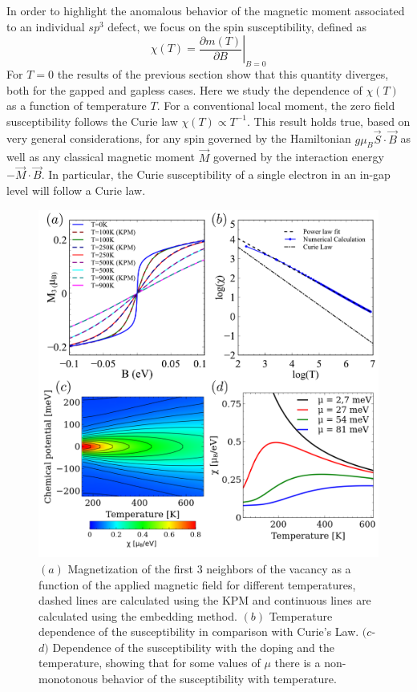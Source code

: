 In order to highlight the anomalous behavior of the magnetic  moment associated to an individual $sp^3$ defect, we focus on the spin susceptibility, defined as
\begin{equation}
  \chi(T) = \left.\frac{\partial m (T)}{\partial B}\right|_{B=0}
\label{susceptibility}
\end{equation}
For $T=0$ the results of the previous section show that this quantity diverges, both for the gapped and gapless cases. Here we study the dependence of $\chi(T)$ as a function of temperature $T$. For a conventional local moment,  the zero field susceptibility follows the Curie law $\chi(T) \propto T^{-1}$. This result holds true, based on very general considerations, for any spin governed by the Hamiltonian $g\mu_B  \vec{S}\cdot\vec{B}$ as well as any classical magnetic moment $\vec{M}$ governed by the interaction energy $-\vec{M}\cdot\vec{B}$. In particular, the Curie susceptibility of a single electron in an in-gap level will follow a Curie law.

\begin{figure}[t!]
  \centering
  \includegraphics{defects/fig/temp_sus.pdf}
  \caption{$(a)$ Magnetization of the first 3 neighbors of the vacancy as a
    function of the applied magnetic field for different temperatures, dashed lines are calculated using the KPM and continuous lines are calculated using the embedding method. $(b)$ Temperature dependence of the susceptibility in comparison with Curie's Law. $(c$-$d)$ Dependence of the susceptibility with the doping and the temperature, showing that for some values of $\mu$ there is a non-monotonous behavior of the susceptibility with temperature.}
  \label{mag_temp}
\end{figure}


